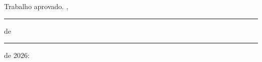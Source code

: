 \documentclass[12pt, %
openright,
oneside, %
a4paper,    %
english,   %
brazil]{facom-ufu-abntex2}
\begin{document}
\frenchspacing

\imprimircapa
\imprimirfolhaderosto

% 
\begin{folhadeaprovacao}

  \begin{center}
    {\ABNTEXchapterfont\large\imprimirautor}

    \vspace*{\fill}\vspace*{\fill}
    {\ABNTEXchapterfont\bfseries\Large\imprimirtitulo}
    \vspace*{\fill}

    \hspace{.45\textwidth}
    \begin{minipage}{.5\textwidth}
        \imprimirpreambulo
    \end{minipage}%
    \vspace*{\fill}
   \end{center}

   Trabalho aprovado. \imprimirlocal, \rule[-0.2em]{2.5em}{0.4pt} de
   \rule[-0.2em]{7em}{0.4pt} de 2026:


   \begin{center}
    \vspace*{0.5cm}
    {\large\imprimirlocal}
    \par
    {\large\imprimirdata}
    \vspace*{1cm}
  \end{center}

\end{folhadeaprovacao}

%
%
\end{document}
